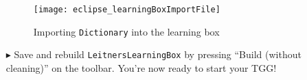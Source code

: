 \begin{itemize}
\vspace{0.5cm}

\begin{figure}[htbp]
\begin{center}
  \texttt{[image: eclipse\_learningBoxImportFile]}
  \caption{Importing \texttt{Dictionary} into the learning box}
  \label{eclipse:importConfigFile}
\end{center}
\end{figure}

\item[$\blacktriangleright$] Save and rebuild \texttt{LeitnersLearningBox} by pressing ``Build (without cleaning)'' on the toolbar. You're now ready to start
your TGG!

\end{itemize}
